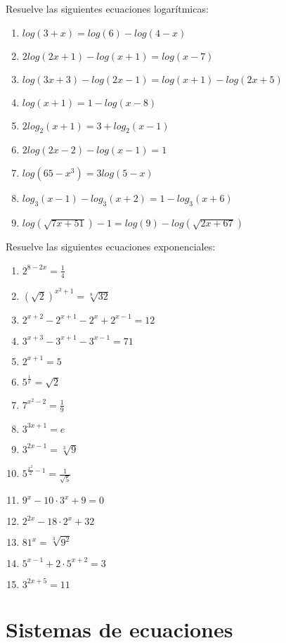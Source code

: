 \Exercicio Resuelve las siguientes ecuaciones logarítmicas:

\begin{enumerate}[topsep=0pt]
	\item $ log(3+x) = log (6) -log(4-x) $
	\item $ 2 log(2x+1) - log(x+1) = log(x-7)$
	\item $ log(3x+3) - log(2x-1) = log(x+1) - log(2x+5)$
	\item $ log(x+1) = 1 - log(x-8)$
	\item $ 2log_2(x+1) = 3 + log_2(x-1)$
	\item $ 2log(2x-2)-log(x-1) = 1$
	\item $ log(65-x^3)= 3log(5-x)$
	\item $ log_3(x-1) - log_3 (x+2) = 1 - log_3(x+6)$
	\item $ log(\sqrt{7x+51}) -1 = log(9) - log(\sqrt{2x+67})$
\end{enumerate}

\Exercicio Resuelve las siguientes ecuaciones exponenciales:

\begin{enumerate}[topsep=0pt]
	\item $ 2^{8-2x} = \frac{1}{4} $
	\item $ (\sqrt{2})^{x^2+1} = \sqrt[8]{32}$
	\item $ 2^{x+2} - 2^{x+1} - 2^x + 2^{x-1} = 12$
	\item $ 3^{x+3} - 3^{x+1} - 3^{x-1} = 71 $
	\item $ 2^{x+1} = 5 $
	\item $ 5^{\frac{1}{x}} = \sqrt{2} $
	\item $ 7^{x^2-2} = \frac{1}{9}$
	\item $ 3^{3x+1} = e$
	\item $ 3^{2x-1} = \sqrt[3]{9}$
	\item $ 5^{\frac{x^2}{2}-1} = \frac{1}{\sqrt{5}}$
	\item $ 9^x - 10 \cdot 3^x + 9 = 0$
	\item $ 2^{2x} - 18 \cdot 2^x + 32$
	\item $ 81^x = \sqrt[3]{9^2}$
	\item $ 5^{x-1} + 2 \cdot 5^{x+2} = 3$
	\item $ 3^{2x+5} = 11$
\end{enumerate}

\section{Sistemas de ecuaciones}

